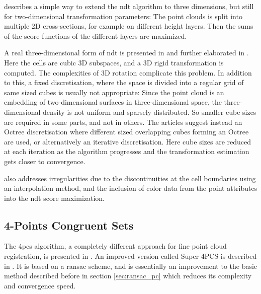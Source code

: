 \cite{Dold2007} describes a simple way to extend the \gls{ndt} algorithm to three dimensions, but still for two-dimensional transformation parameters: The point clouds is split into multiple 2D cross-sections, for example on different height layers. Then the sums of the score functions of the different layers are maximized.

A real three-dimensional form of \gls{ndt} is presented in \cite{Magn2007} and further elaborated in \cite{Magn2013}. Here the cells are cubic 3D subspaces, and a 3D rigid transformation is computed. The complexities of 3D rotation complicate this problem. In addition to this, a fixed discretisation, where the space is divided into a regular grid of same sized cubes is usually not appropriate: Since the point cloud is an embedding of two-dimensional surfaces in three-dimensional space, the three-dimensional density is not uniform and sparsely distributed. So smaller cube sizes are required in some parts, and not in others. The articles suggest instead an Octree discretisation where different sized overlapping cubes forming an Octree are used, or alternatively an iterative discretisation. Here cube sizes are reduced at each iteration as the algorithm progresses and the transformation estimation gets closer to convergence.

\cite{Magn2013} also addresses irregularities due to the discontinuities at the cell boundaries using an interpolation method, and the inclusion of color data from the point attributes into the \gls{ndt} score maximization.


\subsection{4-Points Congruent Sets}
The \gls{4pcs} algorithm, a completely different approach for fine point cloud registration, is presented in \cite{Aige2008}. An improved version called Super-4PCS is described in \cite{Mell2014}. It is based on a \gls{ransac} scheme, and is essentially an improvement to the basic method described before in section \ref{sec:ransac_pc} which reduces its complexity and convergence speed.

